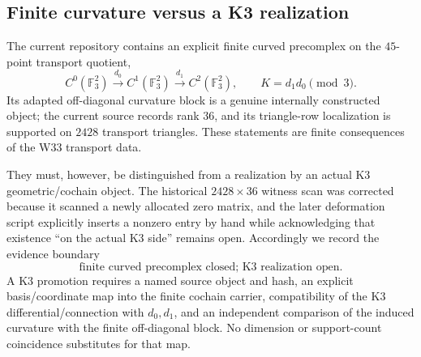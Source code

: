 \subsection{Finite curvature versus a K3 realization}
\label{subsec:k3-realization-boundary}

The current repository contains an explicit finite curved precomplex on the $45$-point
transport quotient,
\[
 C^0(\mathbb F_3^2)\xrightarrow{d_0}C^1(\mathbb F_3^2)
 \xrightarrow{d_1}C^2(\mathbb F_3^2),
 \qquad K=d_1d_0\pmod3.
\]
Its adapted off-diagonal curvature block is a genuine internally constructed object; the
current source records rank $36$, and its triangle-row localization is supported on $2428$
transport triangles.  These statements are finite consequences of the W33 transport data.

They must, however, be distinguished from a realization by an actual K3 geometric/cochain
object.  The historical $2428\times36$ witness scan was corrected because it scanned a newly
allocated zero matrix, and the later deformation script explicitly inserts a nonzero entry by
hand while acknowledging that existence ``on the actual K3 side'' remains open.  Accordingly
we record the evidence boundary
\[
 \boxed{\text{finite curved precomplex closed; K3 realization open}.}
\]
A K3 promotion requires a named source object and hash, an explicit basis/coordinate map into
the finite cochain carrier, compatibility of the K3 differential/connection with $d_0,d_1$,
and an independent comparison of the induced curvature with the finite off-diagonal block.
No dimension or support-count coincidence substitutes for that map.
